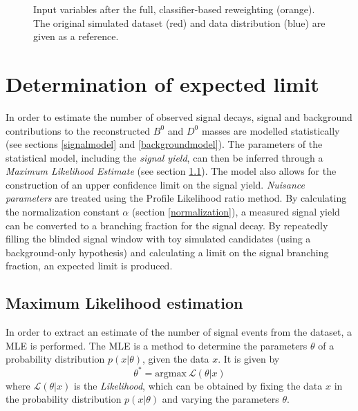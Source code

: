 \begin{figure}
	\begin{subfigure}[t]{0.49\textwidth}
		\centering
    
	\end{subfigure}
	\begin{subfigure}[t]{0.49\textwidth}
		\centering
    
	\end{subfigure}

	\caption{
    Input variables after the full, classifier-based reweighting (orange).
    The original simulated dataset (red) and data distribution (blue) are  given as a reference.
  }
  \label{fig:mcfeaturesreweighted}
\end{figure}


\chapter{Determination of expected limit}

In order to estimate the number of observed signal decays, signal and background contributions to the reconstructed $B^0$ and $D^0$ masses are modelled statistically (see sections \ref{signalmodel} and \ref{backgroundmodel}).
The parameters of the statistical model, including the \emph{signal yield}, can then be inferred through a \emph{Maximum Likelihood Estimate} (see section \ref{mle}).
The model also allows for the construction of an upper confidence limit on the signal yield.
\emph{Nuisance parameters} are treated using the Profile Likelihood ratio method.
By calculating the normalization constant $\alpha$ (section \ref{normalization}), a measured signal yield can be converted to a branching fraction for the signal decay.
By repeatedly filling the blinded signal window with toy simulated candidates (using a background-only hypothesis) and calculating a limit on the signal branching fraction, an expected limit is produced.

\section{Maximum Likelihood estimation}
\label{mle}

In order to extract an estimate of the number of signal events from the dataset, a \gls{MLE} is performed.
The \gls{MLE} is a method to determine the parameters $θ$ of a probability distribution $p(x | θ)$, given the data $x$.
It is given by
\begin{equation}
  θ^* = \mathrm{argmax}\ \mathcal{L}(θ | x)
  \label{eq:mle}
\end{equation}
where $\mathcal{L}(θ | x)$ is the \textit{Likelihood}, which can be obtained by fixing the data $x$ in the probability distribution $p(x | θ)$ and varying the parameters $θ$.

